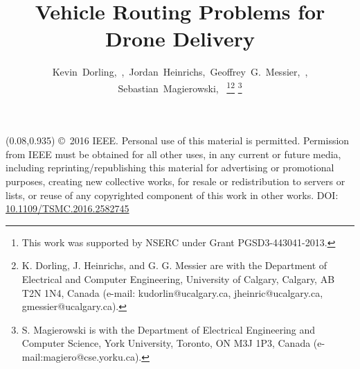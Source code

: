 \documentclass[journal]{IEEEtran}
\begin{document}
\title{Vehicle Routing Problems for Drone Delivery}

\author{Kevin~Dorling,~,~Jordan~Heinrichs,~Geoffrey~G.~Messier,~, Sebastian~Magierowski,~
\thanks{This work was supported by NSERC under Grant PGSD3-443041-2013.}\thanks{K. Dorling, J. Heinrichs, and G. G. Messier are with the Department of Electrical and Computer Engineering, University of Calgary, Calgary, AB T2N 1N4, Canada (e-mail: kudorlin@ucalgary.ca, jheinric@ucalgary.ca, gmessier@ucalgary.ca).}
\thanks{S. Magierowski is with the Department of Electrical Engineering and Computer Science, York University, Toronto, ON M3J 1P3, Canada (e-mail:magiero@cse.yorku.ca).}}

{ 
\begin{textblock}{0.84}(0.08,0.935) 
	\footnotesize
	\noindent
	\copyright~2016 IEEE. Personal use of this material is permitted. Permission from IEEE must be obtained for all other uses, in any current or future media, including reprinting/republishing this material for advertising or promotional purposes, creating new collective works, for resale or redistribution to servers or lists, or reuse of any copyrighted component of this work in other works. DOI: \href{http://dx.doi.org/10.1109/TSMC.2016.2582745}{10.1109/TSMC.2016.2582745}
\end{textblock}
}

\maketitle
\end{document}
